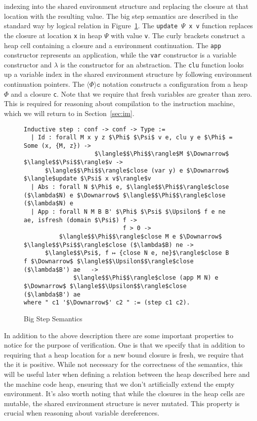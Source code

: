 indexing into the shared environment structure and replacing the closure at that
location with the resulting value. The big step semantics are described in the
standard way by logical relation in Figure~\ref{fig:bigstep}. The \texttt{update
$\Psi$ x v} function replaces the closure at location \texttt{x} in heap $\Psi$
with value \texttt{v}. The curly brackets construct a heap cell containing a
closure and a environment continuation. The \texttt{app} constructor represents
an application, while the \texttt{var} constructor is a variable constructor and
$\lambda$ is the constructor for an abstraction. The \texttt{clu} function looks
up a variable index in the shared environment structure by following environment
continuation pointers.  The $\langle \Phi \rangle \texttt{c}$ notation
constructs a configuration from a heap $\Phi$ and a closure \texttt{c}. Note
that we require that fresh variables are greater than zero. This is required for
reasoning about compilation to the instruction machine, which we will return to
in Section~\ref{sec:im}.

\begin{figure}
\begin{lstlisting}
Inductive step : conf -> conf -> Type :=
  | Id : forall M x y z $\Phi$ $\Psi$ v e, clu y e $\Phi$ = Some (x, {M, z}) -> 
                    $\langle$$\Phi$$\rangle$M $\Downarrow$ $\langle$$\Psi$$\rangle$v ->
      $\langle$$\Phi$$\rangle$close (var y) e $\Downarrow$ $\langle$update $\Psi$ x v$\rangle$v
  | Abs : forall N $\Phi$ e, $\langle$$\Phi$$\rangle$close ($\lambda$N) e $\Downarrow$ $\langle$$\Phi$$\rangle$close ($\lambda$N) e
  | App : forall N M B B' $\Phi$ $\Psi$ $\Upsilon$ f e ne ae, isfresh (domain $\Psi$) f -> 
                            f > 0 ->
          $\langle$$\Phi$$\rangle$close M e $\Downarrow$ $\langle$$\Psi$$\rangle$close ($\lambda$B) ne -> 
      $\langle$$\Psi$, f ↦ {close N e, ne}$\rangle$close B f $\Downarrow$ $\langle$$\Upsilon$$\rangle$close ($\lambda$B') ae   ->
              $\langle$$\Phi$$\rangle$close (app M N) e $\Downarrow$ $\langle$$\Upsilon$$\rangle$close ($\lambda$B') ae
where " c1 '$\Downarrow$' c2 " := (step c1 c2).
\end{lstlisting}
\caption{Big Step Semantics}
\label{fig:bigstep}
\end{figure}

In addition to the above description there are some important properties to
notice for the purpose of verification. One is that we specify that in addition
to requiring that a heap location for a new bound closure is fresh, we require
that the it is positive. While not necessary for the correctness of the
semantics, this will be useful later when defining a relation between the heap
described here and the machine code heap, ensuring that we don't artificially
extend the empty environment. It's also worth noting that while the closures in
the heap cells are mutable, the shared environment structure is never mutated.
This property is crucial when reasoning about variable dereferences. 

